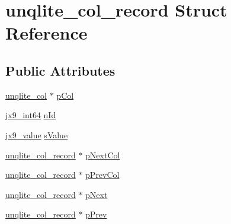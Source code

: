 \hypertarget{structunqlite__col__record}{\section{unqlite\-\_\-col\-\_\-record Struct Reference}
\label{db/d7a/structunqlite__col__record}
}
\subsection*{Public Attributes}
\begin{DoxyCompactItemize}
\item 
\hyperlink{structunqlite__col}{unqlite\-\_\-col} $\ast$ \hyperlink{structunqlite__col__record_a25b6884f0e4bd76a257a661254ae2805}{p\-Col}
\item 
\hyperlink{unqlite_8c_aeaac5ecf324354b1c4bb9f6559bab7af}{jx9\-\_\-int64} \hyperlink{structunqlite__col__record_a24929881f3538a2b14604c3c8d78b67f}{n\-Id}
\item 
\hyperlink{structjx9__value}{jx9\-\_\-value} \hyperlink{structunqlite__col__record_a41d1da545c94450feb7aaf7f406871ca}{s\-Value}
\item 
\hyperlink{structunqlite__col__record}{unqlite\-\_\-col\-\_\-record} $\ast$ \hyperlink{structunqlite__col__record_a3372792ed7ed3eb39125459b7044c1cd}{p\-Next\-Col}
\item 
\hyperlink{structunqlite__col__record}{unqlite\-\_\-col\-\_\-record} $\ast$ \hyperlink{structunqlite__col__record_af59521bf63b07eda93a8d0b52c4bfc9b}{p\-Prev\-Col}
\item 
\hyperlink{structunqlite__col__record}{unqlite\-\_\-col\-\_\-record} $\ast$ \hyperlink{structunqlite__col__record_a36200aeaa911214dbcf9f589dd42cacb}{p\-Next}
\item 
\hyperlink{structunqlite__col__record}{unqlite\-\_\-col\-\_\-record} $\ast$ \hyperlink{structunqlite__col__record_a08427a1110990c5bfc876de687e64c04}{p\-Prev}
\end{DoxyCompactItemize}


